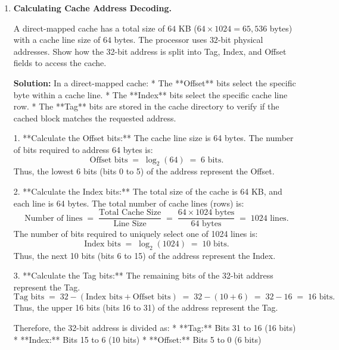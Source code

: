 \documentclass[12pt, a4paper]{book}
\begin{document}
\begin{problembox}
\begin{enumerate}[label=\textbf{E\arabic*.}]
  \item \textbf{Calculating Cache Address Decoding.}
  
        A direct-mapped cache has a total size of $64$ KB ($64 \times 1024 = 65,536$ bytes) with a cache line size of $64$ bytes. The processor uses $32$-bit physical addresses.
        Show how the 32-bit address is split into Tag, Index, and Offset fields to access the cache.
        
        \textbf{Solution:}
        In a direct-mapped cache:
        * The **Offset** bits select the specific byte within a cache line.
        * The **Index** bits select the specific cache line row.
        * The **Tag** bits are stored in the cache directory to verify if the cached block matches the requested address.
        
        1. **Calculate the Offset bits:**
           The cache line size is 64 bytes.
           The number of bits required to address 64 bytes is:
           \[
             \text{Offset bits} \;=\; \log_2(64) \;=\; 6 \text{ bits}.
           \]
           Thus, the lowest 6 bits (bits 0 to 5) of the address represent the Offset.
           
        2. **Calculate the Index bits:**
           The total size of the cache is 64 KB, and each line is 64 bytes.
           The total number of cache lines (rows) is:
           \[
             \text{Number of lines} \;=\; \frac{\text{Total Cache Size}}{\text{Line Size}} \;=\; \frac{64 \times 1024 \text{ bytes}}{64 \text{ bytes}} \;=\; 1024 \text{ lines}.
           \]
           The number of bits required to uniquely select one of 1024 lines is:
           \[
             \text{Index bits} \;=\; \log_2(1024) \;=\; 10 \text{ bits}.
           \]
           Thus, the next 10 bits (bits 6 to 15) of the address represent the Index.
           
        3. **Calculate the Tag bits:**
           The remaining bits of the 32-bit address represent the Tag.
           \[
             \text{Tag bits} \;=\; 32 - (\text{Index bits} + \text{Offset bits}) \;= \; 32 - (10 + 6) \;=\; 32 - 16 \;=\; 16 \text{ bits}.
           \]
           Thus, the upper 16 bits (bits 16 to 31) of the address represent the Tag.
           
        Therefore, the 32-bit address is divided as:
        * **Tag:** Bits 31 to 16 (16 bits)
        * **Index:** Bits 15 to 6 (10 bits)
        * **Offset:** Bits 5 to 0 (6 bits)
        

\end{enumerate}
\end{problembox}
\end{document}
